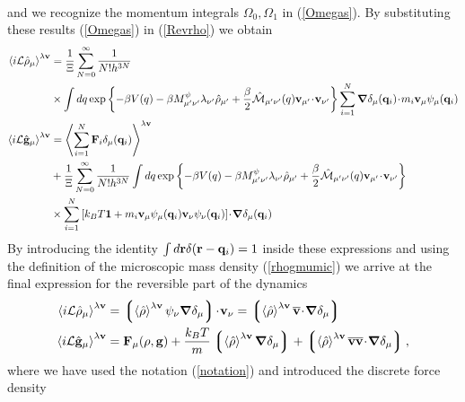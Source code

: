 \documentclass[b5paper,openright,10pt]{book}
\newcommand{\esc}{\!\cdot\!}
\newcommand{\llangle}{\left\langle}
\newcommand{\rrangle}{\right\rangle}
\newcommand{\llg}{\left\lgroup}
\newcommand{\rlg}{\right\rgroup}
\begin{document}
\begin{appendices}
\begin{align}
\label{Revrho}
\end{align}
and  we  recognize  the   momentum  integrals  $\Omega_0,\Omega_1$  in
(\ref{Omegas}).   By  substituting  these  results  (\ref{Omegas})  in
(\ref{Revrho}) we obtain
\begin{align}
  \llangle i{\cal L}\hat{\rho}_\mu\rrangle^{\lambda{\bf v}} &= 
\frac{1}{\Xi} \sum_{N=0}^\infty \frac{1}{N!h^{3N}} \nonumber \\
&\times \int dq  
\exp\left\{-\beta V(q)-\beta M^\psi_{\mu' \nu'}\lambda_{\nu'}\hat{\rho}_{\mu'}
+\frac{\beta}{2}\hat{\cal M}_{\mu'\nu'}(q){\bf v}_{\mu'} \esc{\bf v}_{\nu'}\right\}\sum_{i=1}^N\boldsymbol{\nabla}\delta_\mu({\bf q}_i)\esc m_i{\bf v}_\mu\psi_\mu({\bf q}_i)
\nonumber\\
  \llangle i{\cal L}\hat{\bf g}_\mu\rrangle^{\lambda{\bf v}} &=
  \llangle \sum_{i=1}^N{\bf F}_i\delta_\mu({\bf q}_i)\rrangle^{\lambda{\bf v}}
\nonumber \\
  &+\frac{1}{\Xi} \sum_{N=0}^\infty \frac{1}{N!h^{3N}}\int dq 
\exp\left\{-\beta V(q)-\beta M^\psi_{\mu'\nu'}\lambda_{\nu'}\hat{\rho}_{\mu'}+\frac{\beta}{2}\hat{\cal M}_{\mu'\nu'}(q){\bf v}_{\mu'} \esc{\bf v}_{\nu'}\right\}
\nonumber\\
&\times \sum_{i=1}^N\left[k_BT{\bf 1} 
+ 
m_i{\bf v}_\mu\psi_{\mu}({\bf q}_i)
{\bf v}_\nu\psi_{\nu}({\bf q}_i)\right]
\esc\boldsymbol{\nabla}\delta_\mu({\bf q}_i)
\label{Revrho3}
\end{align}
By introducing the identity $\int d{\bf r}\delta({\bf r}-{\bf q}_i)=1$
inside these expressions  and using the definition  of the microscopic
mass density (\ref{rhogmumic}) we arrive at the final expression for
the reversible part of the dynamics
\begin{align}
  \llangle i{\cal L}\hat{\rho}_\mu\rrangle^{\lambda{\bf v}} &=   \llg\llangle \hat{\rho}\rrangle^{\lambda{\bf v}}\psi_\nu\boldsymbol{\nabla}\delta_\mu \rlg\esc  {\bf v}_\nu
=  \llg\llangle \hat{\rho}\rrangle^{\lambda{\bf v}}\overline{\bf v}\esc  \boldsymbol{\nabla}\delta_\mu \rlg
\nonumber\\
  \llangle i{\cal L}\hat{\bf g}_\mu\rrangle^{\lambda{\bf v}} &={\bf F}_\mu(\rho,{\bf g})
+ \frac{k_BT}{m} \llg \llangle\hat{\rho}\rrangle^{\lambda{\bf v}}\boldsymbol{\nabla}\delta_\mu\rlg
+\llg\llangle \hat{\rho}\rrangle^{\lambda{\bf v}}\overline{\bf v}\overline{\bf v}\esc
\boldsymbol{\nabla}\delta_{\mu}\rlg,
\end{align}
where we have used the notation (\ref{notation}) and introduced the discrete force density 
\begin{align}

\end{align}
\end{appendices}
\end{document}
